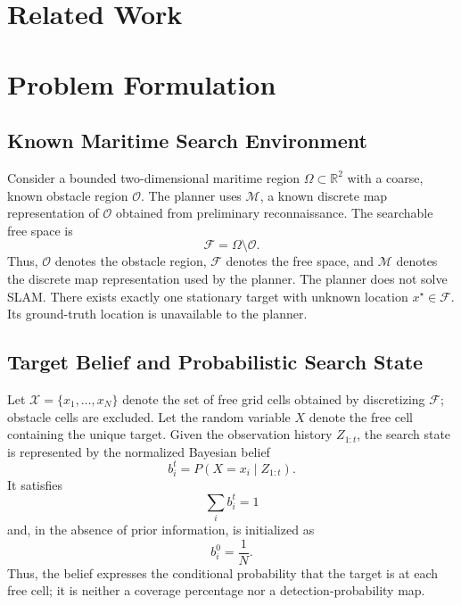\documentclass[letterpaper, 10pt, conference]{ieeeconf}
\begin{document}
\section{Related Work}

\section{Problem Formulation}
\subsection{Known Maritime Search Environment}

Consider a bounded two-dimensional maritime region \(\Omega \subset \mathbb{R}^2\) with a coarse, known obstacle region \(\mathcal{O}\). The planner uses \(\mathcal{M}\), a known discrete map representation of \(\mathcal{O}\) obtained from preliminary reconnaissance. The searchable free space is
\begin{equation}
  \mathcal{F} = \Omega \setminus \mathcal{O}.
  \label{eq:free_space}
\end{equation}
Thus, \(\mathcal{O}\) denotes the obstacle region, \(\mathcal{F}\) denotes the free space, and \(\mathcal{M}\) denotes the discrete map representation used by the planner. The planner does not solve SLAM. There exists exactly one stationary target with unknown location \(x^\star \in \mathcal{F}\). Its ground-truth location is unavailable to the planner.

\subsection{Target Belief and Probabilistic Search State}

Let \(\mathcal{X} = \{x_1, \ldots, x_N\}\) denote the set of free grid cells obtained by discretizing \(\mathcal{F}\); obstacle cells are excluded. Let the random variable \(X\) denote the free cell containing the unique target. Given the observation history \(Z_{1:t}\), the search state is represented by the normalized Bayesian belief
\begin{equation}
  b_i^t = P(X = x_i \mid Z_{1:t}).
  \label{eq:target_belief}
\end{equation}
It satisfies
\begin{equation}
  \sum_i b_i^t = 1
  \label{eq:belief_normalization}
\end{equation}
and, in the absence of prior information, is initialized as
\begin{equation}
  b_i^0 = \frac{1}{N}.
  \label{eq:uniform_prior}
\end{equation}
Thus, the belief expresses the conditional probability that the target is at each free cell; it is neither a coverage percentage nor a detection-probability map.
\end{document}
